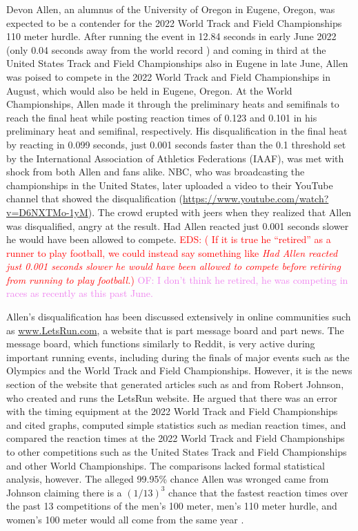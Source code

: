 \documentclass[12pt, letterpaper, titlepage]{article}
\newcommand{\eds}[1]{\textcolor{red}{EDS: (#1)}}
\newcommand{\of}[1]{\textcolor{violet}{OF: #1}}
\begin{document}
Devon Allen, an alumnus of the University of Oregon in Eugene, Oregon, was
expected to be a contender for the 2022 World Track and Field Championships 110 
meter hurdle.  After running the event in 12.84 seconds in early June 2022 
(only 0.04 seconds away from the world record \citep{wa2022preview}) and coming 
in third at the United States Track and Field Championships also in Eugene 
in late June, Allen was poised to compete in the 2022 World Track and 
Field Championships in August, which would also be held in Eugene, Oregon.
At the World Championships, Allen made it through the preliminary
heats and semifinals to reach the final heat while posting reaction times of 
0.123 and 0.101 in his preliminary heat and semifinal, respectively.  
His disqualification in the final heat by reacting in 0.099 seconds, just 0.001
seconds faster than the 0.1 threshold set by the International Association of
Athletics Federations (IAAF), was met
with shock from both Allen and fans alike.  NBC, who was broadcasting the
championships in the United States, later uploaded a video to their YouTube
channel that showed the disqualification
(\url{https://www.youtube.com/watch?v=D6NXTMo-1yM}).
The crowd erupted with jeers
when they realized that Allen was disqualified, angry at the result.  Had Allen 
reacted just 0.001 seconds slower he would have been allowed to compete. %
\eds{ If it is true he ``retired'' as a runner to play football, we could 
instead say something like
\textit{Had Allen reacted just 0.001 seconds slower he would have been allowed 
to compete before retiring from running to play football.}}
\of{I don't think he retired, he was competing in races as recently as this past
June.}


Allen's disqualification has been discussed extensively in online communities
such as \url{www.LetsRun.com}, a website that is part message board and part
news. The message board,
which functions similarly to Reddit, is very active during important running
events, including during the finals of major events such as
the Olympics and the World Track and Field Championships.  However, it is the
news section of the website that generated articles such as \citet{johnson2022data}
and \citet{johnson2022was} from  Robert Johnson, who created and runs 
the LetsRun website.  He argued that there was an error
with the timing equipment at the 2022 World Track and Field Championships and
cited graphs, computed simple statistics such as median reaction times, and 
compared the reaction times at the 2022 World Track and Field Championships to 
other competitions
such as the United States Track and Field Championships and other World Championships.
The comparisons lacked formal statistical analysis, however. 
The alleged 99.95\% chance Allen was wronged 
came from Johnson claiming there is a $(1/13)^3$ chance that the fastest 
reaction times over the past 13 competitions of the men's 100 meter, men's 110 
meter hurdle, and women's 100 meter would all come from the same year 
\citep{johnson2022was}.
\end{document}
